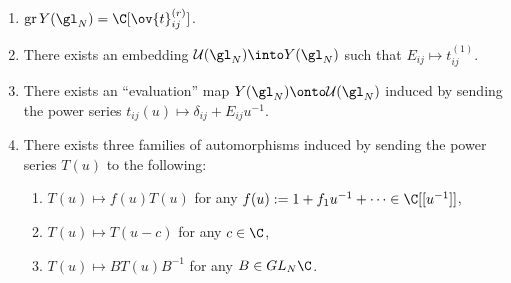 \documentclass[11pt,leqno,oneside]{amsbook}
\numberwithin{thm}{section}
\newcommand{\U}{\mathcal{U}}
\newcommand{\associatedGraded}{\operatorname{gr}}
\begin{document}
\begin{cor}
  \begin{enumerate}
  \item \(\associatedGraded Y(\gl_N) = \C[\ov{t}_{ij}^{(r)}]\).
  \item There exists an embedding \(\U(\gl_N) \into Y(\gl_N)\) such
    that \(E_{ij} \mapsto t_{ij}^{(1)}\).
  \item There exists an ``evaluation'' map \(Y(\gl_N) \onto
    \U(\gl_N)\) induced by sending the power series \(t_{ij}(u)
    \mapsto \delta_{ij}+E_{ij}u^{-1}\).
  \item There exists three families of automorphisms induced by sending the power series
    \(T(u)\) to the following:
    \begin{enumerate}[label=(\roman*)]
    \item \(T(u) \mapsto f(u)T(u)\) for any \(f(u) :=
      1+f_1u^{-1}+\cdots \in \C[[u^{-1}]]\),
    \item \(T(u) \mapsto T(u-c)\) for any \(c \in \C\),
    \item \(T(u) \mapsto BT(u)B^{-1}\) for any \(B \in GL_N\C\).
    \end{enumerate}

  \end{enumerate}
\end{cor}
\end{document}
